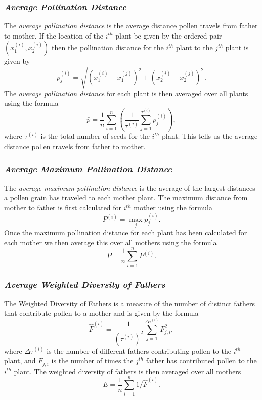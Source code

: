 \documentclass[preprint,12pt]{elsarticle}
\numberwithin{equation}{subsection}
\begin{document}
\subsubsection*{\emph{Average Pollination Distance}}
The \emph{average pollination distance} is the average distance pollen travels
from father to mother. If the location of the $i^{th}$ plant be given by the
ordered pair $\left(x^{\left(i\right)}_1, x^{\left(i\right)}_2\right)$ then the
pollination distance for the $i^{th}$ plant to the $j^{th}$ plant is given by
\[
	p^{\left(i\right)}_j = \sqrt{\left(x^{\left(i\right)}_1 -
x^{\left(j\right)}_1\right)^2 + \left(x^{\left(i\right)}_2 -
		x^{\left(j\right)}_2\right)^2}.
\]
The \emph{average pollination distance} for each plant is then averaged over all
plants using the formula
\[
	\bar{p} = \frac{1}{n} \sum_{i=1}^{n} \left(
\frac{1}{\tau^{\left(i\right)}} \sum_{j=1}^{\tau^{\left(i\right)}}
p^{\left(i\right)}_j
		\right),
\]
where $\tau^{\left(i\right)}$ is the total number of seeds for the $i^{th}$
plant. This tells us the average distance pollen travels from father to mother.

\subsubsection*{\emph{Average Maximum Pollination Distance}}
The \emph{average maximum pollination distance} is the average of the largest
distances a pollen grain has traveled to each mother plant. The maximum distance
from mother to father is first calculated for $i^{th}$ mother using the formula
\[
	P^{\left(i\right)} = \max_j p^{\left(i\right)}_j.
\]
Once the maximum pollination distance for each plant has been calculated for
each mother we then average this over all mothers using the formula
\[
	\bar{P} = \frac{1}{n} \sum_{i=1}^{n} P^{\left(i\right)}.
\]

\subsubsection*{\emph{Average Weighted Diversity of Fathers}}
The Weighted Diversity of Fathers is a measure of the number of distinct fathers
that contribute pollen to a mother and is given by the formula
\[
	\hat{F}^{\left(i\right)} =
\frac{1}{\left(\tau^{\left(i\right)}\right)^2}
\sum_{j=1}^{\Delta\tau^{\left(i\right)}} F^2_{j,i},
\]
where $\Delta\tau^{\left(i\right)}$ is the number of different fathers
contributing pollen to the $i^{th}$ plant, and $F_{j,i}$ is the number of times
the $j^{th}$ father has contributed pollen to the $i^{th}$ plant. The weighted
diversity of fathers is then averaged over all mothers
\[
	E = \frac{1}{n} \sum_{i=1}^n 1/\hat{F}^{\left(i\right)}.
\]
\end{document}
